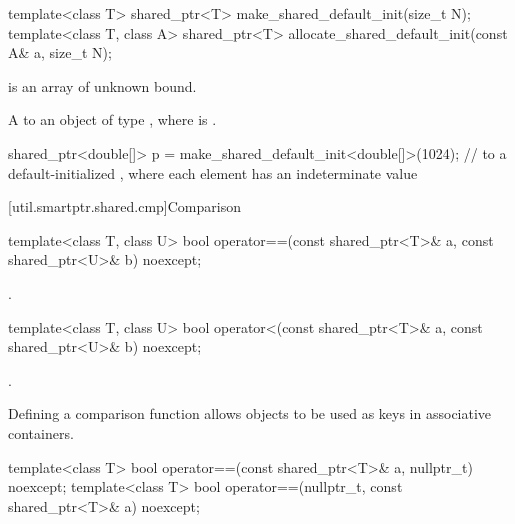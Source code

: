 %
%
\begin{itemdecl}
template<class T>
  shared_ptr<T> make_shared_default_init(size_t N);
template<class T, class A>
  shared_ptr<T> allocate_shared_default_init(const A& a, size_t N);
\end{itemdecl}

\begin{itemdescr}
\pnum
\constraints
{} is an array of unknown bound.

\pnum
\returns
A  to an object of type ,
where  is .

\pnum
\begin{example}
\begin{codeblock}
shared_ptr<double[]> p = make_shared_default_init<double[]>(1024);
  //  to a default-initialized , where each element has an indeterminate value
\end{codeblock}
\end{example}
\end{itemdescr}

[util.smartptr.shared.cmp]{Comparison}

%
\begin{itemdecl}
template<class T, class U>
  bool operator==(const shared_ptr<T>& a, const shared_ptr<U>& b) noexcept;
\end{itemdecl}

\begin{itemdescr}
\pnum
\returns {}.
\end{itemdescr}

%
\begin{itemdecl}
template<class T, class U>
  bool operator<(const shared_ptr<T>& a, const shared_ptr<U>& b) noexcept;
\end{itemdecl}

\begin{itemdescr}
\pnum
\returns {}.

\pnum
\begin{note}
Defining a comparison function allows  objects to be
used as keys in associative containers.
\end{note}
\end{itemdescr}

%
\begin{itemdecl}
template<class T>
  bool operator==(const shared_ptr<T>& a, nullptr_t) noexcept;
template<class T>
  bool operator==(nullptr_t, const shared_ptr<T>& a) noexcept;
\end{itemdecl}

